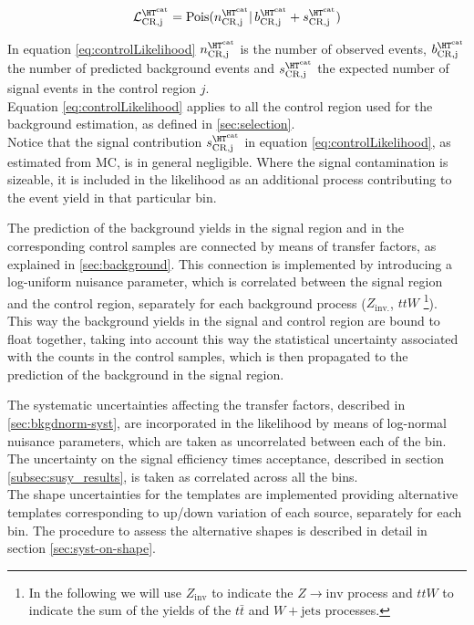 \begin{equation}
\mathcal{L}^{\htcat}_{\mathrm{CR,j}}=\mathrm{Pois}(n^{\htcat}_{\mathrm{CR,j}} |\, b^{\htcat}_{\mathrm{CR,j}} + s^{\htcat}_{\mathrm{CR,j}})
\label{eq:controlLikelihood}
\end{equation}

In equation \ref{eq:controlLikelihood} $n^{\htcat}_{\mathrm{CR,j}}$ is the number of observed events, $b^{\htcat}_{\mathrm{CR,j}}$ the number of predicted 
background events and $s^{\htcat}_{\mathrm{CR,j}}$ the expected number of signal events in the control region $j$. \\
Equation \ref{eq:controlLikelihood} applies to all the control region used for the background estimation, 
as defined in \ref{sec:selection}. \\
Notice that the signal contribution $s^{\htcat}_{\mathrm{CR,j}}$ in equation \ref{eq:controlLikelihood}, as estimated from MC, is in general negligible. 
Where the signal contamination is sizeable, it is included in the likelihood as an additional process contributing to the event yield in that particular bin.

The prediction of the background yields in the signal region and in the corresponding control samples are connected 
by means of transfer factors, as explained in \ref{sec:background}. 
This connection is implemented by introducing a log-uniform nuisance parameter, which is correlated 
between the signal region and the control region, separately for each background process ($Z_{\mathrm{inv.}}$, $ttW$ \footnote{In the following we will use $Z_{\mathrm{inv}}$ to indicate the $Z\to \mathrm{inv}$ process and $ttW$ to indicate the sum of the yields of the $t\bar{t}$ and $W+\mathrm{jets}$ processes.}). \\
This way the background yields in the signal and control region are bound to float together, 
taking into account this way the statistical uncertainty associated with the counts in the control samples, which is then propagated to the 
prediction of the background in the signal region. 

The systematic uncertainties affecting the transfer factors, described in \ref{sec:bkgdnorm-syst}, 
are incorporated in the likelihood by means of log-normal nuisance parameters, 
which are taken as uncorrelated between each of the \htcat bin. \\
The uncertainty on the signal efficiency times acceptance, described in section \ref{subsec:susy_results}, is taken as correlated across all the \htcat bins. \\
The shape uncertainties for the \mht templates are implemented providing alternative templates corresponding to up/down variation of each source, separately for each \htcat bin. The procedure to assess the alternative shapes is described in detail in section \ref{sec:syst-on-shape}. 

